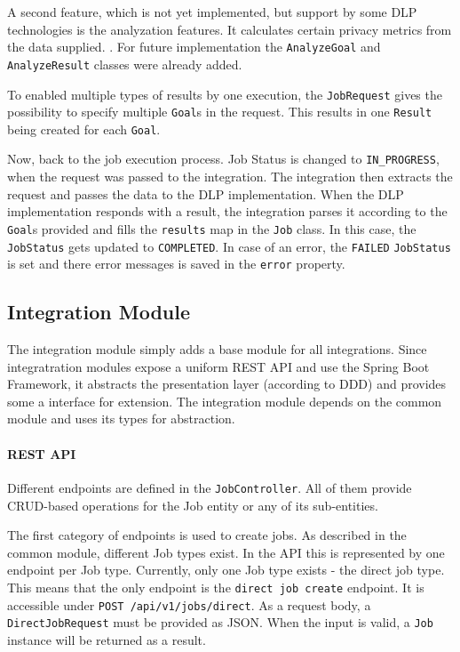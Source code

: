 A second feature, which is not yet implemented, but support by some DLP technologies is the analyzation features. It calculates certain privacy metrics from the data supplied. . For future implementation the \texttt{AnalyzeGoal} and \texttt{AnalyzeResult} classes were already added.

To enabled multiple types of results by one execution, the \texttt{JobRequest} gives the possibility to specify multiple \texttt{Goal}s in the request. This results in one \texttt{Result} being created for each \texttt{Goal}.

Now, back to the job execution process. Job Status is changed to \texttt{IN\_PROGRESS}, when the request was passed to the integration. The integration then extracts the request and passes the data to the DLP implementation. When the DLP implementation responds with a result, the integration parses it according to the \texttt{Goal}s provided and fills the \texttt{results} map in the \texttt{Job} class. In this case, the \texttt{JobStatus} gets updated to \texttt{COMPLETED}. In case of an error, the \texttt{FAILED} \texttt{JobStatus} is set and there error messages is saved in the \texttt{error} property.


\subsection{Integration Module}

The integration module simply adds a base module for all integrations. Since integratration modules expose a uniform REST API and use the Spring Boot Framework, it abstracts the presentation layer (according to DDD)  and provides some a interface for extension. The integration module depends on the common module and uses its types for abstraction. 

\paragraph{REST API}
Different endpoints are defined in the \texttt{JobController}. All of them provide CRUD-based operations for the Job entity or any of its sub-entities.

The first category of endpoints is used to create jobs. As described in the common module, different Job types exist. In the API this is represented by one endpoint per Job type. Currently, only one Job type exists - the direct job type. This means that the only endpoint is the \texttt{direct job create} endpoint. It is accessible under \texttt{POST /api/v1/jobs/direct}. As a request body, a \texttt{DirectJobRequest} must be provided as JSON. When the input is valid, a \texttt{Job} instance will be returned as a result.


